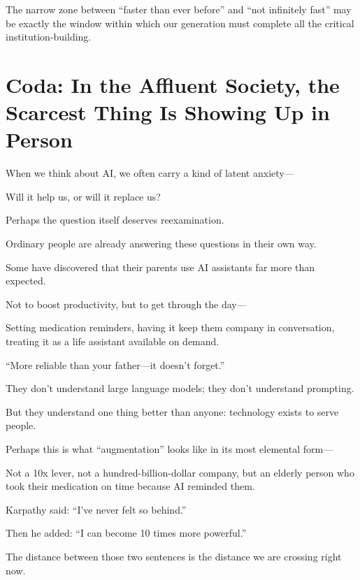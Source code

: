 \vspace{1em}

The narrow zone between ``faster than ever before'' and ``not infinitely fast'' may be exactly the window within which our generation must complete all the critical institution-building.

\newpage
\section{Coda: In the Affluent Society, the Scarcest Thing Is Showing Up in Person}

When we think about AI, we often carry a kind of latent anxiety---

Will it help us, or will it replace us?

Perhaps the question itself deserves reexamination.

\vspace{1em}

Ordinary people are already answering these questions in their own way.

Some have discovered that their parents use AI assistants far more than expected.

Not to boost productivity, but to get through the day---

Setting medication reminders, having it keep them company in conversation, treating it as a life assistant available on demand.

``More reliable than your father---it doesn't forget.''

They don't understand large language models; they don't understand prompting.

But they understand one thing better than anyone: technology exists to serve people.

Perhaps this is what ``augmentation'' looks like in its most elemental form---

Not a 10x lever, not a hundred-billion-dollar company, but an elderly person who took their medication on time because AI reminded them.

\vspace{1em}

Karpathy said: ``I've never felt so behind.''

Then he added: ``I can become 10 times more powerful.''

The distance between those two sentences is the distance we are crossing right now.

